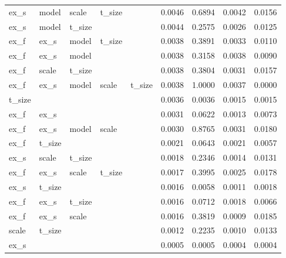 \begin{table}
\begin{tabular}{lllllrrrr}
   ex\_s &   model &   scale &  t\_size &         &                0.0046 &           0.6894 &         0.0042 &    0.0156 \\
   ex\_s &   model &  t\_size &         &         &                0.0044 &           0.2575 &         0.0026 &    0.0125 \\
   ex\_f &    ex\_s &   model &  t\_size &         &                0.0038 &           0.3891 &         0.0033 &    0.0110 \\
   ex\_f &    ex\_s &   model &         &         &                0.0038 &           0.3158 &         0.0038 &    0.0090 \\
   ex\_f &   scale &  t\_size &         &         &                0.0038 &           0.3804 &         0.0031 &    0.0157 \\
   ex\_f &    ex\_s &   model &   scale &  t\_size &                0.0038 &           1.0000 &         0.0037 &    0.0000 \\
 t\_size &         &         &         &         &                0.0036 &           0.0036 &         0.0015 &    0.0015 \\
   ex\_f &    ex\_s &         &         &         &                0.0031 &           0.0622 &         0.0013 &    0.0073 \\
   ex\_f &    ex\_s &   model &   scale &         &                0.0030 &           0.8765 &         0.0031 &    0.0180 \\
   ex\_f &  t\_size &         &         &         &                0.0021 &           0.0643 &         0.0021 &    0.0057 \\
   ex\_s &   scale &  t\_size &         &         &                0.0018 &           0.2346 &         0.0014 &    0.0131 \\
   ex\_f &    ex\_s &   scale &  t\_size &         &                0.0017 &           0.3995 &         0.0025 &    0.0178 \\
   ex\_s &  t\_size &         &         &         &                0.0016 &           0.0058 &         0.0011 &    0.0018 \\
   ex\_f &    ex\_s &  t\_size &         &         &                0.0016 &           0.0712 &         0.0018 &    0.0066 \\
   ex\_f &    ex\_s &   scale &         &         &                0.0016 &           0.3819 &         0.0009 &    0.0185 \\
  scale &  t\_size &         &         &         &                0.0012 &           0.2235 &         0.0010 &    0.0133 \\
   ex\_s &         &         &         &         &                0.0005 &           0.0005 &         0.0004 &    0.0004 \\
\bottomrule
\end{tabular}
\end{table}
